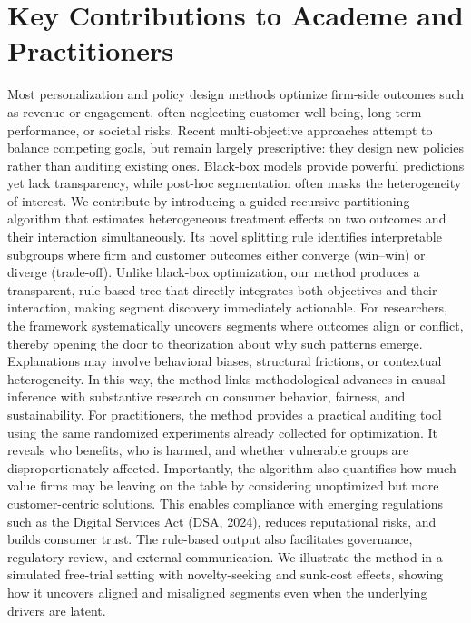 \documentclass[11pt,letterpaper,english]{article}
\begin{document}
\section{Key Contributions to Academe and Practitioners}
Most personalization and policy design methods optimize firm-side outcomes such as revenue or engagement, often neglecting customer well-being, long-term performance, or societal risks. Recent multi-objective approaches attempt to balance competing goals, but remain largely prescriptive: they design new policies rather than auditing existing ones. Black-box models provide powerful predictions yet lack transparency, while post-hoc segmentation often masks the heterogeneity of interest.
We contribute by introducing a guided recursive partitioning algorithm that estimates heterogeneous treatment effects on two outcomes and their interaction simultaneously. Its novel splitting rule identifies interpretable subgroups where firm and customer outcomes either converge (win–win) or diverge (trade-off). Unlike black-box optimization, our method produces a transparent, rule-based tree that directly integrates both objectives and their interaction, making segment discovery immediately actionable.
For researchers, the framework systematically uncovers segments where outcomes align or conflict, thereby opening the door to theorization about why such patterns emerge. Explanations may involve behavioral biases, structural frictions, or contextual heterogeneity. In this way, the method links methodological advances in causal inference with substantive research on consumer behavior, fairness, and sustainability.
For practitioners, the method provides a practical auditing tool using the same randomized experiments already collected for optimization. It reveals who benefits, who is harmed, and whether vulnerable groups are disproportionately affected. Importantly, the algorithm also quantifies how much value firms may be leaving on the table by considering unoptimized but more customer-centric solutions. This enables compliance with emerging regulations such as the Digital Services Act (DSA, 2024), reduces reputational risks, and builds consumer trust. The rule-based output also facilitates governance, regulatory review, and external communication.
We illustrate the method in a simulated free-trial setting with novelty-seeking and sunk-cost effects, showing how it uncovers aligned and misaligned segments even when the underlying drivers are latent.



\end{document}
